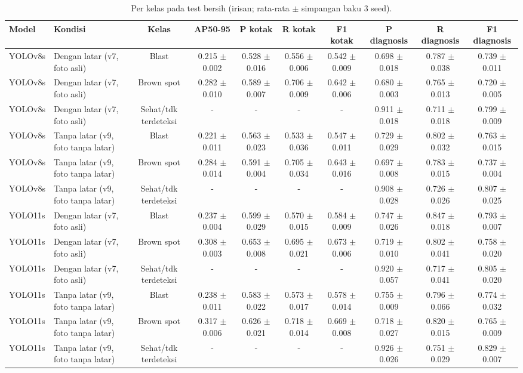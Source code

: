\begin{table}[!t]
\centering
\caption{Per kelas pada test bersih (irisan; rata-rata $\pm$ simpangan baku 3 seed).}
\label{tab:v9_per_kelas}
\footnotesize
\setlength{\tabcolsep}{3pt}
\begin{tabular}{llcccccccc}
\hline
\textbf{Model} & \textbf{Kondisi} & \textbf{Kelas} & \textbf{AP50-95} & \textbf{P kotak} & \textbf{R kotak} & \textbf{F1 kotak} & \textbf{P diagnosis} & \textbf{R diagnosis} & \textbf{F1 diagnosis} \\
\hline
YOLOv8s & Dengan latar (v7, foto asli) & Blast & 0.215 $\pm$ 0.002 & 0.528 $\pm$ 0.016 & 0.556 $\pm$ 0.006 & 0.542 $\pm$ 0.009 & 0.698 $\pm$ 0.018 & 0.787 $\pm$ 0.038 & 0.739 $\pm$ 0.011 \\
YOLOv8s & Dengan latar (v7, foto asli) & Brown spot & 0.282 $\pm$ 0.010 & 0.589 $\pm$ 0.007 & 0.706 $\pm$ 0.009 & 0.642 $\pm$ 0.006 & 0.680 $\pm$ 0.003 & 0.765 $\pm$ 0.013 & 0.720 $\pm$ 0.005 \\
YOLOv8s & Dengan latar (v7, foto asli) & Sehat/tdk terdeteksi & - & - & - & - & 0.911 $\pm$ 0.018 & 0.711 $\pm$ 0.018 & 0.799 $\pm$ 0.009 \\
YOLOv8s & Tanpa latar (v9, foto tanpa latar) & Blast & 0.221 $\pm$ 0.011 & 0.563 $\pm$ 0.023 & 0.533 $\pm$ 0.036 & 0.547 $\pm$ 0.011 & 0.729 $\pm$ 0.029 & 0.802 $\pm$ 0.032 & 0.763 $\pm$ 0.015 \\
YOLOv8s & Tanpa latar (v9, foto tanpa latar) & Brown spot & 0.284 $\pm$ 0.014 & 0.591 $\pm$ 0.004 & 0.705 $\pm$ 0.034 & 0.643 $\pm$ 0.016 & 0.697 $\pm$ 0.008 & 0.783 $\pm$ 0.015 & 0.737 $\pm$ 0.004 \\
YOLOv8s & Tanpa latar (v9, foto tanpa latar) & Sehat/tdk terdeteksi & - & - & - & - & 0.908 $\pm$ 0.028 & 0.726 $\pm$ 0.026 & 0.807 $\pm$ 0.025 \\
YOLO11s & Dengan latar (v7, foto asli) & Blast & 0.237 $\pm$ 0.004 & 0.599 $\pm$ 0.029 & 0.570 $\pm$ 0.015 & 0.584 $\pm$ 0.009 & 0.747 $\pm$ 0.026 & 0.847 $\pm$ 0.018 & 0.793 $\pm$ 0.007 \\
YOLO11s & Dengan latar (v7, foto asli) & Brown spot & 0.308 $\pm$ 0.003 & 0.653 $\pm$ 0.008 & 0.695 $\pm$ 0.021 & 0.673 $\pm$ 0.006 & 0.719 $\pm$ 0.010 & 0.802 $\pm$ 0.041 & 0.758 $\pm$ 0.020 \\
YOLO11s & Dengan latar (v7, foto asli) & Sehat/tdk terdeteksi & - & - & - & - & 0.920 $\pm$ 0.057 & 0.717 $\pm$ 0.041 & 0.805 $\pm$ 0.020 \\
YOLO11s & Tanpa latar (v9, foto tanpa latar) & Blast & 0.238 $\pm$ 0.011 & 0.583 $\pm$ 0.022 & 0.573 $\pm$ 0.017 & 0.578 $\pm$ 0.014 & 0.755 $\pm$ 0.009 & 0.796 $\pm$ 0.066 & 0.774 $\pm$ 0.032 \\
YOLO11s & Tanpa latar (v9, foto tanpa latar) & Brown spot & 0.317 $\pm$ 0.006 & 0.626 $\pm$ 0.021 & 0.718 $\pm$ 0.014 & 0.669 $\pm$ 0.008 & 0.718 $\pm$ 0.027 & 0.820 $\pm$ 0.015 & 0.765 $\pm$ 0.009 \\
YOLO11s & Tanpa latar (v9, foto tanpa latar) & Sehat/tdk terdeteksi & - & - & - & - & 0.926 $\pm$ 0.026 & 0.751 $\pm$ 0.029 & 0.829 $\pm$ 0.007 \\
\hline
\end{tabular}
\end{table}
